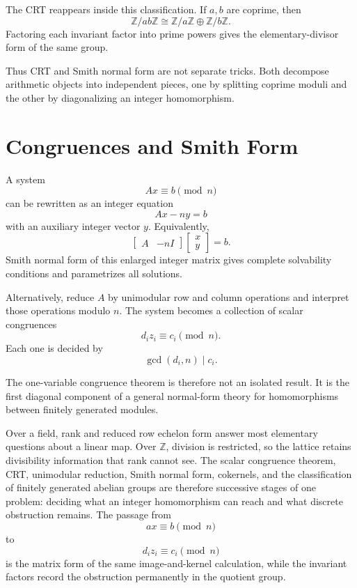 The CRT reappears inside this classification.  If \(a,b\) are coprime, then
\[
  \mathbb Z/ab\mathbb Z
  \cong
  \mathbb Z/a\mathbb Z
  \oplus
  \mathbb Z/b\mathbb Z.
\]
Factoring each invariant factor into prime powers gives the elementary-divisor form of the same group.

Thus CRT and Smith normal form are not separate tricks.  Both decompose arithmetic objects into independent pieces, one by splitting coprime moduli and the other by diagonalizing an integer homomorphism.

\section{Congruences and Smith Form}

A system
\[
  Ax\equiv b\pmod n
\]
can be rewritten as an integer equation
\[
  Ax-ny=b
\]
with an auxiliary integer vector \(y\).  Equivalently,
\[
  \begin{bmatrix}A&-nI\end{bmatrix}
  \begin{bmatrix}x\\y\end{bmatrix}
  =b.
\]
Smith normal form of this enlarged integer matrix gives complete solvability conditions and parametrizes all solutions.

Alternatively, reduce \(A\) by unimodular row and column operations and interpret those operations modulo \(n\).  The system becomes a collection of scalar congruences
\[
  d_i z_i\equiv c_i\pmod n.
\]
Each one is decided by
\[
  \gcd(d_i,n)\mid c_i.
\]

The one-variable congruence theorem is therefore not an isolated result.  It is the first diagonal component of a general normal-form theory for homomorphisms between finitely generated modules.

Over a field, rank and reduced row echelon form answer most elementary questions about a linear map.  Over \(\mathbb Z\), division is restricted, so the lattice retains divisibility information that rank cannot see.  The scalar congruence theorem, CRT, unimodular reduction, Smith normal form, cokernels, and the classification of finitely generated abelian groups are therefore successive stages of one problem: deciding what an integer homomorphism can reach and what discrete obstruction remains.  The passage from
\[
  ax\equiv b\pmod n
\]
to
\[
  d_i z_i\equiv c_i\pmod n
\]
is the matrix form of the same image-and-kernel calculation, while the invariant factors record the obstruction permanently in the quotient group.
